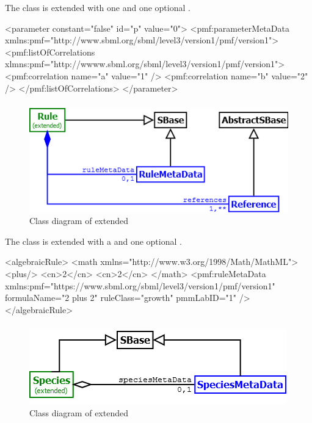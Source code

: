 The \Parameter class is extended with one \ListOfCorrelations and one optional
\ParameterMetaData.

\begin{example}
<parameter constant="false" id="p" value="0">
  <pmf:parameterMetaData xmlns:pmf="http://www.sbml.org/sbml/level3/version1/pmf/version1">
  <pmf:listOfCorrelations xlmns:pmf="http://wwww.sbml.org/sbml/level3/version1/pmf/version1">
    <pmf:correlation name="a" value="1" />
    <pmf:correlation name="b" value="2" />
  </pmf:listOfCorrelations>
</parameter>
\end{example}

\subsubsection{}
\begin{figure}[h]
	\includegraphics[scale=0.8]{img/Rule}
	\caption{Class diagram of extended \Rule}
	\label{Rule}
\end{figure}

The \Rule class is extended with a \ListOfReferences and one optional
\RuleMetaData.
\begin{example}[showstringspaces=false]
<algebraicRule>
  <math xmlns="http://www.w3.org/1998/Math/MathML">
    <plus/>
    <cn>2</cn>
    <cn>2</cn>
  </math>
  <pmf:ruleMetaData xmlns:pmf="https://www.sbml.org/sbml/level3/version1/pmf/version1"
    formulaName="2 plus 2" ruleClass="growth" pmmLabID="1" />
</algebraicRule>
\end{example}

\subsubsection{}
\begin{figure}[h]
	\includegraphics[scale=0.9]{img/Species}
	\caption{Class diagram of extended \Species}
	\label{Species}
\end{figure}

